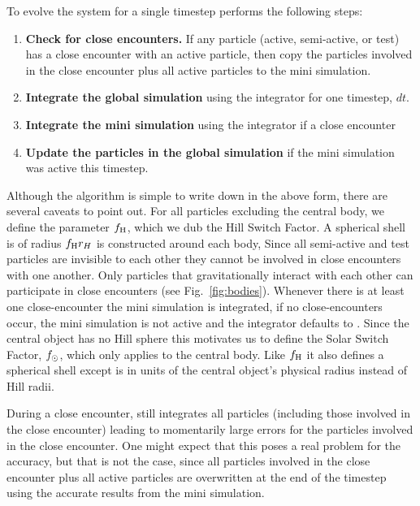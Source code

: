To evolve the system for a single timestep \hermes performs the following steps:
\begin{enumerate}
\item \label{step1} \textbf{Check for close encounters.} If any particle (active, semi-active, or test) has a close encounter with an active particle, then copy the particles involved in the close encounter plus all active particles to the mini simulation. 
\item \textbf{Integrate the global simulation} using the \whfast integrator for one timestep, $dt$.
\item \textbf{Integrate the mini simulation} using the \ias integrator if a close encounter  
\item \textbf{Update the particles in the global simulation}  if the mini simulation was active this timestep.
\end{enumerate}

Although the algorithm is simple to write down in the above form, there are several caveats to point out.
For all particles excluding the central body, we define the parameter $f_{\rm H}$, which we dub the Hill Switch Factor. 
A spherical shell is of radius $f_{\rm H} r_H$ is constructed around each body, 
Since all semi-active and test particles are invisible to each other they cannot be involved in close encounters with one another.
Only particles that gravitationally interact with each other can participate in close encounters (see Fig.~\ref{fig:bodies}).
Whenever there is at least one close-encounter the mini simulation is integrated, if no close-encounters occur, the mini simulation is not active and the integrator defaults to \whfast. 
Since the central object has no Hill sphere this motivates us to define the Solar Switch Factor, $f_{\rm \odot}$, which only applies to the central body. 
Like $f_{\rm H}$ it also defines a spherical shell except is in units of the central object's physical radius instead of Hill radii.

During a close encounter, \whfast still integrates all particles (including those involved in the close encounter) leading to momentarily large errors for the particles involved in the close encounter.
One might expect that this poses a real problem for the accuracy, but that is not the case, since all particles involved in the close encounter plus all active particles are overwritten at the end of the timestep using the accurate results from the mini simulation.

